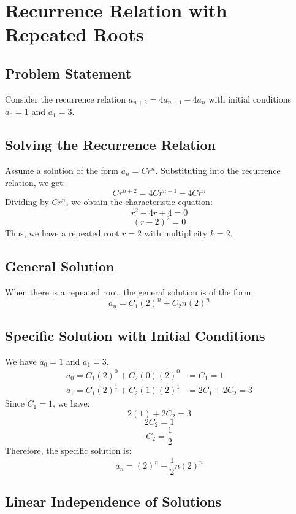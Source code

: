 \documentclass{report}
\begin{document}
\section{Recurrence Relation with Repeated Roots}

\subsection{Problem Statement}

Consider the recurrence relation $a_{n+2} = 4a_{n+1} - 4a_n$ with initial conditions $a_0 = 1$ and $a_1 = 3$.

\subsection{Solving the Recurrence Relation}

Assume a solution of the form $a_n = Cr^n$. Substituting into the recurrence relation, we get:
$$Cr^{n+2} = 4Cr^{n+1} - 4Cr^n$$
Dividing by $Cr^n$, we obtain the characteristic equation:
$$r^2 - 4r + 4 = 0$$
$$(r-2)^2 = 0$$
Thus, we have a repeated root $r = 2$ with multiplicity $k = 2$.

\subsection{General Solution}

When there is a repeated root, the general solution is of the form:
$$a_n = C_1(2)^n + C_2n(2)^n$$

\subsection{Specific Solution with Initial Conditions}

We have $a_0 = 1$ and $a_1 = 3$.
\begin{align*}
	a_0 = C_1(2)^0 + C_2(0)(2)^0 & = C_1 = 1         \\
	a_1 = C_1(2)^1 + C_2(1)(2)^1 & = 2C_1 + 2C_2 = 3
\end{align*}
Since $C_1 = 1$, we have:
$$2(1) + 2C_2 = 3$$
$$2C_2 = 1$$
$$C_2 = \frac{1}{2}$$
Therefore, the specific solution is:
$$a_n = (2)^n + \frac{1}{2}n(2)^n$$

\subsection{Linear Independence of Solutions}
\end{document}
